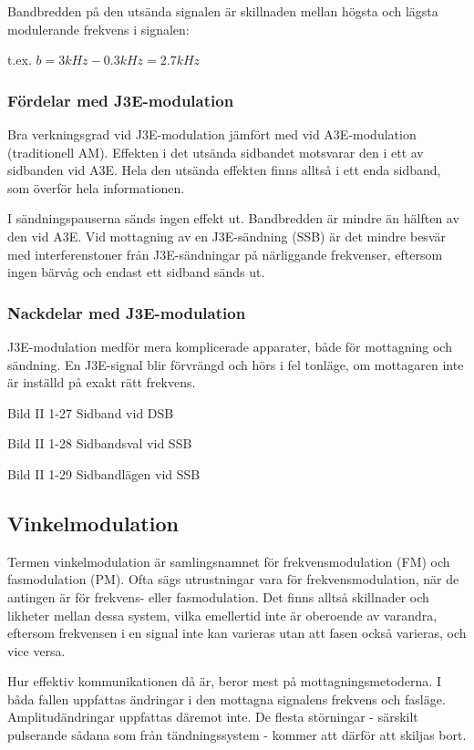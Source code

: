 Bandbredden på den utsända signalen är skillnaden mellan högsta och lägsta
modulerande frekvens i signalen:

t.ex. \(b = 3kHz - 0.3 kHz = 2.7 kHz\)

\subsubsection{Fördelar med J3E-modulation}
Bra verkningsgrad vid J3E-modulation jämfört med vid A3E-modulation (traditionell AM).
Effekten i det utsända sidbandet motsvarar den i ett av sidbanden vid A3E. Hela den
utsända effekten finns alltså i ett enda sidband, som överför hela informationen.

I sändningspauserna sänds ingen effekt ut. Bandbredden är mindre än hälften av den
vid A3E. Vid mottagning av en J3E-sändning (SSB) är det mindre besvär med interferenstoner
från J3E-sändningar på närliggande frekvenser, eftersom ingen bärvåg och endast ett
sidband sänds ut.

\subsubsection{Nackdelar med J3E-modulation}
J3E-modulation medför mera komplicerade apparater, både för mottagning och sändning.
En J3E-signal blir förvrängd och hörs i fel tonläge, om mottagaren inte är inställd på
exakt rätt frekvens.

Bild II 1-27 Sidband vid DSB

Bild II 1-28 Sidbandsval vid SSB

Bild II 1-29 Sidbandlägen vid SSB

\subsection{Vinkelmodulation}
Termen vinkelmodulation är samlingsnamnet för frekvensmodulation (FM) och fasmodulation
(PM). Ofta sägs utrustningar vara för frekvensmodulation, när de antingen är för frekvens-
eller fasmodulation. Det finns alltså skillnader och likheter mellan dessa system, vilka
emellertid inte är oberoende av varandra, eftersom frekvensen i en signal inte kan
varieras utan att fasen också varieras, och vice versa.

Hur effektiv kommunikationen då är, beror mest på mottagningsmetoderna. I båda fallen
uppfattas ändringar i den mottagna signalens frekvens och fasläge. Amplitudändringar
uppfattas däremot inte. De flesta störningar - särskilt pulserande sådana som från
tändningssystem - kommer att därför att skiljas bort.


